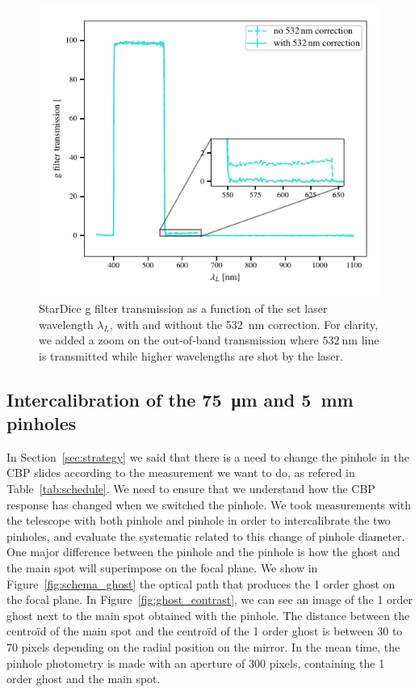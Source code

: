 \begin{figure}[h]
    \centering
    \includegraphics[width=\columnwidth]{fig/g_filter_532.pdf}
    \caption{StarDice g filter transmission as a function of the set laser wavelength $\lambda_L$, with and without the \SI{532}{\nm} correction. For clarity, we added a zoom on the out-of-band transmission where $\SI{532}{\nm}$ line is transmitted while higher wavelengths are shot by the laser.}
    \label{fig:g_filter_532}
\end{figure}

\subsection{Intercalibration of the \SI{75}{\micro\meter} and \SI{5}{\mm} pinholes}

In Section~\ref{sec:strategy} we said that there is a need to change the pinhole in the CBP slides according to the measurement we want to do, as refered in Table~\ref{tab:schedule}. We need to ensure that we understand how the CBP response has changed when we switched the pinhole. We took measurements with the \SD telescope with both \bpinhole pinhole and \spinhole pinhole in order to intercalibrate the two pinholes, and evaluate the systematic related to this change of pinhole diameter. One major difference between the \spinhole pinhole and the \bpinhole pinhole is how the ghost and the main spot will superimpose on the focal plane.  We show in Figure~\ref{fig:schema_ghost} the optical path that produces the 1 order ghost on the focal plane. In Figure~\ref{fig:ghost_contrast}, we can see an image of the 1 order ghost next to the main spot obtained with the \spinhole pinhole. The distance between the centroïd of the main spot and the centroïd of the 1 order ghost is between 30 to 70 pixels depending on the radial position on the mirror. In the mean time, the \bpinhole pinhole photometry is made with an aperture of 300 pixels, containing the 1 order ghost and the main spot. 

